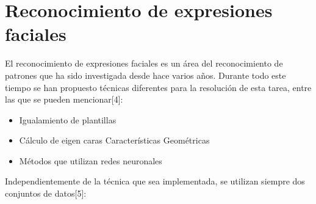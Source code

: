 \vskip 5cm

\section{Reconocimiento de expresiones faciales}

El reconocimiento de expresiones faciales es un área del reconocimiento de patrones que ha sido investigada desde hace varios años. Durante todo este tiempo se han propuesto técnicas diferentes para la resolución de esta tarea, entre las que se pueden mencionar[4]:

\begin{itemize}
\item Igualamiento de plantillas
\item Cálculo de eigen caras Características Geométricas
\item Métodos que utilizan redes neuronales
\end{itemize}

Independientemente de la técnica que sea implementada, se utilizan siempre dos conjuntos de datos[5]:

